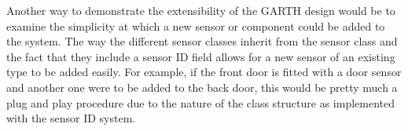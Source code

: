 \documentclass{article}
\begin{document}
Another way to demonstrate the extensibility of the GARTH design would be to
examine the simplicity at which a new sensor or component could be added to the
system. The way the different sensor classes inherit from the sensor class and
the fact that they include a sensor ID field allows for a new sensor of an 
existing type to be added easily. For example, if the front door is fitted with
a door sensor and another one were to be added to the back door, this would
be pretty much a plug and play procedure due to the nature of the class structure
as implemented with the sensor ID system.
\end{document}
